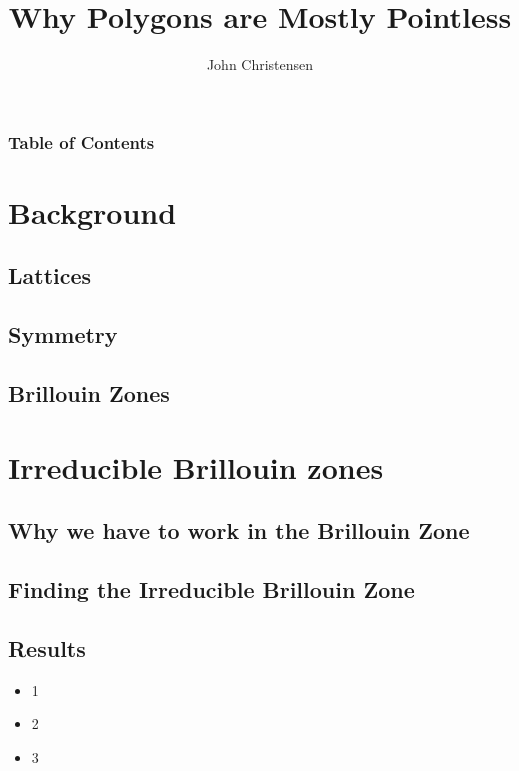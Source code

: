 \documentclass[aspectratio=169]{beamer}
\title{Why Polygons are Mostly Pointless}
\author{John Christensen}
\institute{Brigham Young University}
\date{}
\begin{document}
\frame{\titlepage}

\begin{frame}
    \frametitle{Table of Contents}
    \tableofcontents
\end{frame} 

\section{Background}
\subsection{Lattices}
\subsection{Symmetry}
\subsection{Brillouin Zones}
\section{Irreducible Brillouin zones}
\subsection{Why we have to work in the Brillouin Zone}
\subsection{Finding the Irreducible Brillouin Zone}
\subsection{Results}
\begin{frame}
    \begin{itemize}
        \item 1\pause
        \item 2\pause
        \item 3
    \end{itemize} 
\end{frame}
\end{document}
